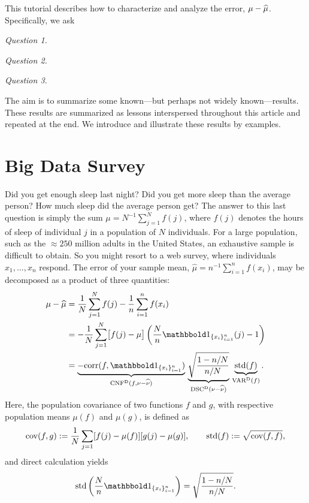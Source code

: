\documentclass[graybox,footinfo]{svmult}
\DeclareMathOperator{\Cov}{cov}
\DeclareMathOperator{\algn}{CNF}
\DeclareMathOperator{\disc}{DSC}
\DeclareMathOperator{\Var}{VAR}
\begin{document}
This tutorial describes how to characterize and analyze the error, $\mu - \widehat{\mu}$.  
Specifically, we ask
\begin{list}{}{\setlength\leftmargin{7ex}\setlength{}}
\item[\emph{Question 1.}] \emph{\FJHQOne}
\item[\emph{Question 2.}] \emph{\FJHQTwo}
\item[\emph{Question 3.}] \emph{\FJHQThree}
\end{list}
\noindent The aim is to summarize some known---but perhaps not widely 
known---results.  These results are summarized as lessons interspersed throughout this 
article and repeated at the end.  We introduce and illustrate these 
results by examples.

\section{Big Data Survey} \label{FJH:sec:sleep} 
Did you get enough sleep last night?  Did you get more sleep than the average person?  
How much sleep did the average person get? The answer to this last question is simply 
the sum
$\mu = N^{-1} \sum_{j=1}^N f(j)$, where $f(j)$ denotes the hours of sleep of individual 
$j$ in a population of $N$ individuals.  For a large population, such as the $\approx 250$ 
million adults in the United States, an exhaustive sample is difficult to obtain. So you 
might resort to a 
web survey, where individuals $x_1, \ldots, x_n$ respond.  The error of 
your sample mean, $\widehat{\mu} = n^{-1} \sum_{i=1}^n f(x_i)$, may be decomposed as 
a 
product of three quantities:
\begin{align}
\nonumber
\mu - \widehat{\mu} 
&= \frac{1}N \sum_{j=1}^N f(j) -  \frac 1n \sum_{i=1}^n f(x_i)  \\
\nonumber
&= - \frac{1}N \sum_{j=1}^N \bigl[ f(j) - \mu \bigr]\left ( \frac Nn \bbone_{\{x_i\}_{i=1}^n}(j) 
- 1 \right) \\
& = \underbrace{-\corr(f, \bbone_{\{x_i\}_{i=1}^n})}_{\algn^\Dt(f,\nu - \hnu)} \,
\underbrace{\sqrt{\frac{1 - n/N}{n/N}}}_{\disc^\Dt(\nu - \hnu)} \, 
\underbrace{\std(f)}_{\Var^\Dt(f)}.
\label{FJH:eq:surveydettrio}
\end{align}
Here, the population covariance of two functions $f$ and $g$, with respective 
population means $\mu(f)$ and $\mu(g)$, is defined as 
\begin{equation*}
\Cov(f,g) : = \frac 1N \sum_{j=1} [f(j) - \mu(f)] [g(j) - \mu(g)], \qquad 
\std(f) : = \sqrt{\Cov(f,f)},
\end{equation*}
and direct calculation yields
\begin{equation*}
\std\left(\frac Nn \bbone_{\{x_i\}_{i=1}^n}\right) = \sqrt{\frac{1 - n/N}{n/N}}.
\end{equation*}
\end{document}
